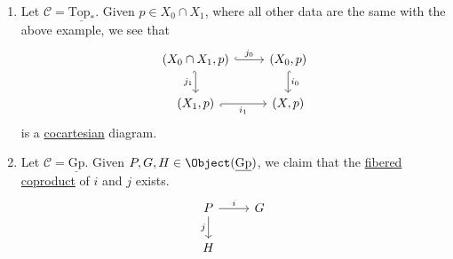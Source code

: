 \begin{eg}
\begin{enumerate}
\begin{proof}
			      \[
				      h(x) = \begin{dcases}
					      f(x), & \text{ if } x\in X_0; \\
					      g(x), & \text{ if } x\in X_1.
				      \end{dcases}
			      \]
			      \(h\) is clearly well-defined since the diagram commutes, so if \(x\in X_0 \cap X_1\), then \(f(x) = g(x)\).
			      The only thing we need to show is that \(h\) is continuous. But this is obvious too since \(X = \mathrm{int}(X_0) \cup \mathrm{int}(X_1)\), and
			      \[
				      \at{h}{\mathrm{int}(X_0)}{} = \at{f}{\mathrm{int}(X_0)}{},\quad \at{h}{\mathrm{int}(X_1)}{} = \at{g}{\mathrm{int}(X_1)}{}.
			      \]
			      The uniqueness is trivial, hence this is indeed a \hyperref[def:cocartesian]{cocartesian} diagram.
		      \end{proof}
		\item Let \(\mathscr{C} = \underline{\mathrm{Top}_\ast}\). Given \(p\in X_0\cap X_1\), where all other data are the same with the above example, we see that
		      \[
			      \begin{tikzcd}
				      {(X_0\cap X_1, p)} & {(X_0, p)} \\
				      {(X_1, p)} & {(X, p)}
				      \arrow["{j_1}"', hook', from=1-1, to=2-1]
				      \arrow["{i_1}"', hook', from=2-1, to=2-2]
				      \arrow["{i_0}", hook, from=1-2, to=2-2]
				      \arrow["{j_0}", hook, from=1-1, to=1-2]
			      \end{tikzcd}
		      \]
		      is a \hyperref[def:cocartesian]{cocartesian} diagram.
		\item Let \(\mathscr{C} = \underline{\mathrm{Gp}}\). Given \(P, G, H\in \Object (\underline{\mathrm{Gp}})\), we claim that the \hyperref[def:fibered-coproduct]{fibered coproduct}
		      of \(i\) and \(j\) exists.
		      \[
			      \begin{tikzcd}
				      P & G \\
				      H
				      \arrow["j"', from=1-1, to=2-1]
				      \arrow["i", from=1-1, to=1-2]
			      \end{tikzcd}
		      \]


\end{enumerate}
\end{eg}
